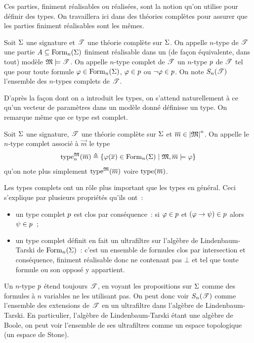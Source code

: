 Ces parties, finiment réalisables ou réalisées, sont la notion qu'on utilise
pour définir des types. On travaillera ici dans des théories complètes pour
assurer que les parties finiment réalisables sont les mêmes.

\begin{definition}
  Soit $\Sigma$ une signature et $\mathscr T$ une théorie complète sur $\Sigma$. On
  appelle $n$-type de $\mathscr T$ une partie $A\subseteq\operatorname{Form}_n(\Sigma)$
  finiment réalisable dans un (de façon équivalente, dans tout) modèle
  $\mathfrak{M}\models\mathscr T$. On appelle $n$-type complet de $\mathscr T$ un $n$-type
  $p$ de $\mathscr T$ tel que pour toute formule $\varphi\in\operatorname{Form}_n(\Sigma)$,
  $\varphi\in p$ ou $\lnot\varphi\in p$. On note $\TypCpl(\varT)$
  l'ensemble des $n$-types complets de $\mathscr T$.
  \index[notation]{$\TypCpl(\varT)$}
\end{definition}

D'après la façon dont on a introduit les types, on s'attend naturellement à ce
qu'un vecteur de paramètres dans un modèle donné définisse un type. On remarque
même que ce type est complet.

\begin{definition}
  Soit $\Sigma$ une signature, $\mathscr T$ une théorie complète sur $\Sigma$ et
  $\overline{m} \in \left\vert \mathfrak{M}\right\vert^n$. On appelle le $n$-type complet associé à $\vec m$
  le type
  \[\operatorname{type}^{\mathfrak{M}}_n(\overline{m}) \triangleq
  \left\{ \varphi(\overline{x})\in\operatorname{Form}_n(\Sigma) \;\middle\vert\; \mathfrak{M},\overline{m} \models\varphi \right\}\]
  qu'on note plus simplement $\operatorname{type}^{\mathfrak{M}}(\overline{m})$ voire $\operatorname{type}(\overline{m})$.
\end{definition}

Les types complets ont un rôle plus important que les types en général. Ceci
s'explique par plusieurs propriétés qu'ils ont~:
\begin{itemize}
\item un type complet $p$ est clos par conséquence~: si
  $\varphi\in p$ et $(\varphi\to\psi)\in p$ alors
  $\psi\in p$~;
\item un type complet définit en fait un ultrafiltre sur l'algèbre de
  Lindenbaum-Tarski de $\operatorname{Form}_n(\Sigma)$~: c'est un ensemble de formules clos
  par intersection et conséquence, finiment réalisable donc ne contenant pas
  $\bot$ et tel que toute formule ou son opposé y appartient.
\end{itemize}
Un $n$-type $p$ étend toujours $\mathscr T$, en voyant les propositions sur
$\Sigma$ comme des formules à $n$ variables ne les utilisant pas. On peut
donc voir $\TypCpl(\varT)$ comme l'ensemble des extensions de $\mathscr T$ en un
ultrafiltre dans l'algèbre de Lindenbaum-Tarski. En particulier, l'algèbre de
Lindenbaum-Tarski étant une algèbre de Boole, on peut voir l'ensemble de ses
ultrafiltres comme un espace topologique (un espace de Stone).

